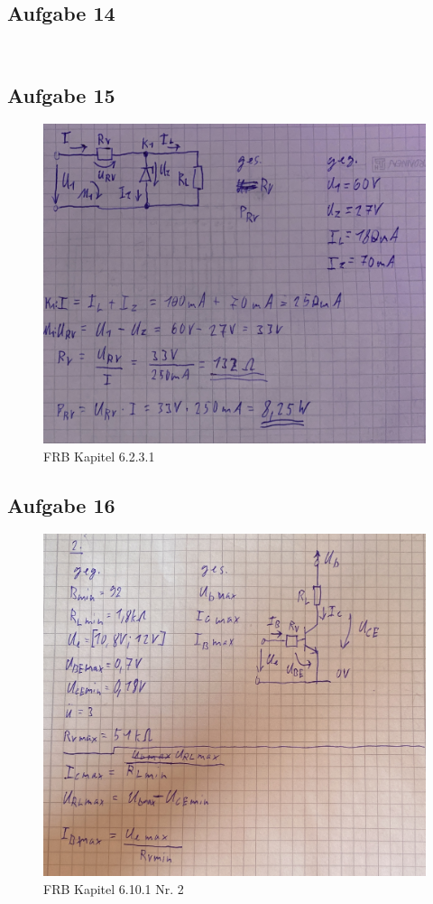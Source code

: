 \documentclass{article}
\begin{document}
\clearpage
\subsection{Aufgabe 14}
\inputminted[linenos]{c++}{res/code/global.c}
\inputminted[linenos]{c++}{res/code/ET_50_KL_07.c}

\clearpage
\subsection{Aufgabe 15}

\begin{figure}[H]
    \centering
    \includegraphics[width=0.75\linewidth]{A15_6_2_3_1.JPG}
    \caption{FRB Kapitel 6.2.3.1}
\end{figure}

\clearpage
\subsection{Aufgabe 16}

\begin{figure}[H]
    \centering
    \includegraphics[width=0.75\linewidth]{A16_6_10_1.jpg}
    \caption{FRB Kapitel 6.10.1 Nr. 2}
\end{figure}
\end{document}
